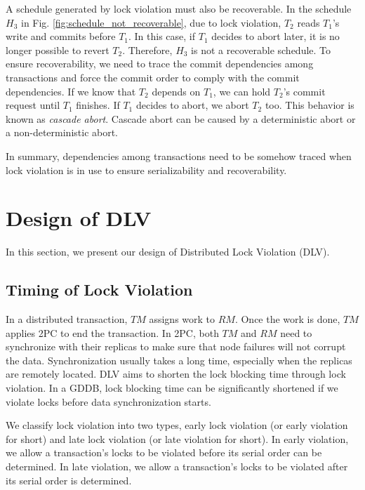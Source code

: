\documentclass[conference]{IEEEtran}
\begin{document}
A schedule generated by lock violation must also be recoverable.
In the schedule ${H_3}$ in Fig.   \ref{fig:schedule_not_recoverable}, due to lock violation,
${T_2}$ reads  ${T_1}$'s write and commits before ${T_1}$.
In this case, if ${T_1}$ decides to abort later, it is no longer possible to revert ${T_2}$.
Therefore, ${H_3}$ is not a recoverable schedule.
To ensure recoverability, we need to trace the commit dependencies among transactions and force the commit order to comply with the commit dependencies.
If we know that ${T_2}$ depends on ${T_1}$, we can hold ${T_2}$'s commit request until ${T_1}$ finishes.
If ${T_1}$ decides to abort, we abort ${T_2}$ too.
This behavior is known as \emph{cascade abort}.
Cascade abort can be caused by a deterministic abort or a non-deterministic abort.

In summary, dependencies among transactions need to be somehow traced when lock violation is in use to ensure serializability and recoverability.

\section{Design of DLV}
\label{sec:implement}

In this section, we present our design of Distributed Lock Violation (DLV).

\subsection {Timing of Lock Violation}


In a distributed transaction, $TM$ assigns work to $RM$. Once the work is done, $TM$ applies 2PC to end the transaction.
In 2PC, both $TM$ and $RM$ need to synchronize with their replicas to make sure that node failures will not corrupt the data.
Synchronization usually takes a long time, especially when the replicas are remotely located.
DLV aims to shorten the lock blocking time through lock violation.
In a GDDB, lock blocking time can be significantly shortened if we violate locks before data synchronization starts.

We classify lock violation into two types, early lock violation (or early violation for short) and late lock violation (or late violation for short).
In early violation,  we allow a transaction's locks to be violated before its serial order can be determined.
In late violation,  we allow a transaction's locks to be violated after its serial order is determined.
\end{document}
